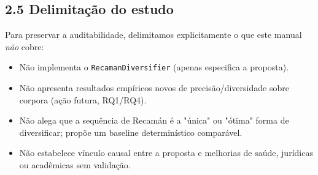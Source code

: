 \subsection*{2.5 Delimitação do estudo}

 Para preservar a auditabilidade, delimitamos explicitamente o que este
manual \emph{não} cobre:

\begin{itemize}
  \item Não implementa o \texttt{RecamanDiversifier} (apenas especifica a
        proposta).
  \item Não apresenta resultados empíricos novos de precisão/diversidade sobre
        corpora (ação futura, RQ1/RQ4).
  \item Não alega que a sequência de Recamán é a "única" ou "ótima" forma de
        diversificar; propõe um baseline determinístico comparável.
  \item Não estabelece vínculo causal entre a proposta e melhorias de saúde,
        jurídicas ou acadêmicas sem validação.
\end{itemize}
